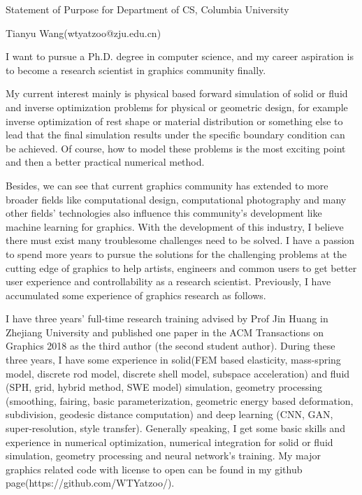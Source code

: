 \documentclass[a4paper,12pt]{article}
\begin{document}
\centerline{\large{Statement of Purpose for Department of CS, Columbia University}}
\vspace{2ex}
\centerline{\large{Tianyu Wang(wtyatzoo@zju.edu.cn)}}
\vspace{2ex}

I want to pursue a Ph.D. degree in computer science, and my career aspiration is to become a research scientist in graphics community finally.\vspace{1.2ex}

My current interest mainly is physical based forward simulation of solid or fluid and inverse optimization problems for physical or geometric design, for example inverse optimization of rest shape or material distribution or something else to lead that the final simulation results under the specific boundary condition can be achieved. Of course, how to model these problems is the most exciting point and then a better practical numerical method.\vspace{1.2ex}

Besides, we can see that current graphics community has extended to more broader fields like computational design, computational photography and many other fields' technologies also influence this community's development like machine learning for graphics. With the development of this industry, I believe there must exist many troublesome challenges need to be solved. I have a passion to spend more years to pursue the solutions for the challenging problems at the cutting edge of graphics to help artists, engineers and common users to get better user experience and controllability as a research scientist. Previously, I have accumulated some experience of graphics research as follows. \vspace{1.2ex}  

I have three years' full-time research training advised by Prof Jin Huang in Zhejiang University and published one paper in the ACM Transactions on Graphics 2018 as the third author (the second student author). During these three years, I have some experience in solid(FEM based elasticity, mass-spring model, discrete rod model, discrete shell model, subspace acceleration) and fluid (SPH, grid, hybrid method, SWE model) simulation, geometry processing (smoothing, fairing, basic parameterization, geometric energy based deformation, subdivision, geodesic distance computation) and deep learning (CNN, GAN, super-resolution, style transfer). Generally speaking, I get some basic skills and experience in numerical optimization, numerical integration for solid or fluid simulation, geometry processing and neural network's training. My major graphics related code with license to open can be found in my github page(https://github.com/WTYatzoo/). \vspace{1.2ex} 
\end{document}
